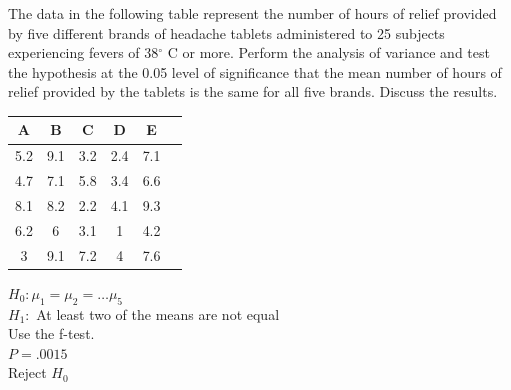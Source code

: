 \documentclass[addpoints,12pt]{exam}
\begin{document}
\begin{questions}
\question The data in the following table represent the
number of hours of relief provided by five different
brands of headache tablets administered to 25 subjects
experiencing fevers of 38$^{\circ}$
C or more. Perform the analysis
of variance and test the hypothesis at the 0.05 level
of significance that the mean number of hours of relief
provided by the tablets is the same for all five brands.
Discuss the results.
\begin{table}[H]
\begin{center}
\begin{tabular}{|c|c|c|c|c|c|}
\hline
A&B&C&D&E\\ \hline
5.2&9.1&3.2&2.4&7.1\\
4.7&7.1&5.8&3.4&6.6\\
8.1&8.2&2.2&4.1&9.3\\
6.2&6&3.1&1&4.2\\
3&9.1&7.2&4&7.6\\ \hline
\end{tabular}
\end{center}
\label{default}
\end{table}%
\begin{solution}
$H_0: \mu_1 = \mu_2 = \ldots \mu_5$\\
$H_1:$ At least two of the means are not equal\\
Use the f-test.\\
$P = .0015$\\
Reject $H_0$
\end{solution}




\end{questions}
\end{document}

